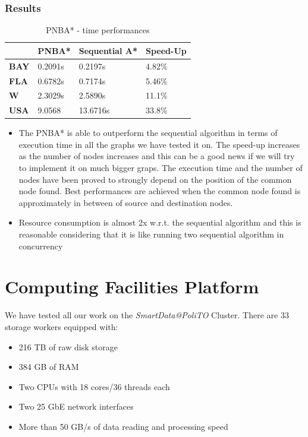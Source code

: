 \documentclass[twocolumn, switch]{article} %
\begin{document}
\subsubsection{Results}
\begin{table}[ht!]
  \centering
  \caption{PNBA* - time performances}
  \begin{tabular}{|l|l|l|l|}
  \hline
  \textbf{}    & \textbf{PNBA*} & \textbf{Sequential A*} & \textbf{Speed-Up} \\ \hline
  \textbf{BAY} & 0.2091s        & 0.2197s                & 4.82\%            \\ \hline
  \textbf{FLA} & 0.6782s        & 0.7174s                & 5.46\%            \\ \hline
  \textbf{W}   & 2.3029s        & 2.5890s                & 11.1\%            \\ \hline
  \textbf{USA} & 9.0568         & 13.6716s               & 33.8\%            \\ \hline
  \end{tabular}
\end{table}
\begin{itemize}
  \item The PNBA* is able to outperform the sequential algorithm in terms of execution time in all the 
        graphs we have tested it on. The speed-up increases as the number of nodes increases and this can 
        be a good news if we will try to implement it on much bigger graps. The execution time and the number of
        nodes have been proved to strongly depend on the position of the common node found. Best performances
        are achieved when the common node found is approximately in between of source and destination nodes.
  \item Resource consumption is almost 2x w.r.t. the sequential algorithm and this is reasonable considering
        that it is like running two sequential algorithm in concurrency
\end{itemize}
\section{Computing Facilities Platform}
We have tested all our work on the \textit{SmartData@PoliTO} Cluster.
There are $33$ storage workers equipped with:
\begin{itemize}
  \item 216 TB of raw disk storage
  \item 384 GB of RAM
  \item Two CPUs with 18 cores/36 threads each
  \item Two 25 GbE network interfaces
  \item More than 50 GB/s of data reading and processing speed
\end{itemize}
\end{document}
